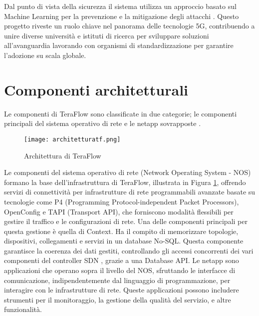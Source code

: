 Dal punto di vista della sicurezza il sistema utilizza un approccio basato sul Machine Learning per la prevenzione e la mitigazione degli attacchi \cite{D41}.
\newline Questo progetto riveste un ruolo chiave nel panorama delle tecnologie 5G, contribuendo a unire diverse università e istituti di ricerca per sviluppare soluzioni all'avanguardia
lavorando con organismi di standardizzazione per garantire l'adozione su scala globale.
\section{Componenti architetturali}
Le componenti di TeraFlow sono classificate in due categorie; le componenti principali del sistema operativo di rete e le netapp sovrapposte \cite{Component}. 
\begin{figure}[h]
    \centering
   \texttt{[image: architetturatf.png]}
    \caption{Architettura di TeraFlow \cite{archtfs}}
    \label{fig:tfs}
\end{figure}
Le componenti del sistema operativo di rete (Network Operating System - NOS) formano la base dell'infrastruttura di TeraFlow, illustrata in Figura \ref{fig:tfs}, offrendo servizi di connettività per infrastrutture di rete programmabili avanzate \cite{Component} %
basate su tecnologie come P4 (Programming Protocol-independent Packet Processors), OpenConfig e TAPI (Transport API), che forniscono modalità flessibili per gestire il traffico e le configurazioni di rete.
Una delle componenti principali per questa gestione è quella di Context. Ha il compito di memorizzare topologie, dispositivi, 
collegamenti e servizi in un database No-SQL\cite{D31}. 
Questa componente garantisce la coerenza dei dati gestiti, controllando gli accessi concorrenti dei vari componenti del controller SDN \cite{arttfs},
grazie a una Database API.
\newline Le netapp sono applicazioni che operano sopra il livello del NOS, sfruttando le interfacce di comunicazione, indipendentemente dal linguaggio di programmazione, per interagire con le infrastrutture di rete.
Queste applicazioni possono includere strumenti per il monitoraggio, la gestione della qualità del servizio, e altre funzionalità.
